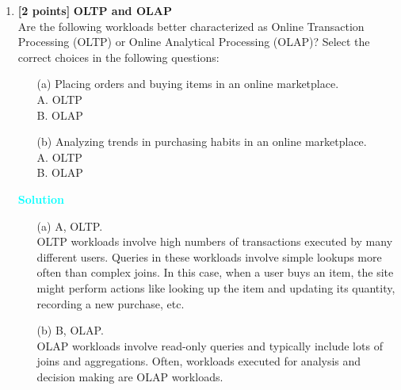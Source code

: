 \documentclass[10pt]{article}
\newenvironment{solution}
    { \begin{mdframed}[backgroundcolor=gray!10] \textcolor{cyan}{\textbf{Solution}} \\}
    {  \end{mdframed}}
\begin{document}
\begin{enumerate}
	\item \textbf{[2 points]} \textbf{OLTP and OLAP} \\
	      Are the following workloads better characterized as Online Transaction Processing (OLTP)
	      or Online Analytical Processing (OLAP)? Select the correct choices in the following questions: \\
	      \begin{itemize}
		      \item[(a)] Placing orders and buying items in an online marketplace. \\
		            A. OLTP \\
		            B. OLAP
		      \item[(b)] Analyzing trends in purchasing habits in an online marketplace. \\
		            A. OLTP \\
		            B. OLAP
	      \end{itemize}
	      \begin{solution}
		      \begin{itemize}
			      \item[(a)] A, OLTP. \\
			            OLTP workloads involve high numbers of transactions executed by many different users.
			            Queries in these workloads involve simple lookups more often than complex
			            joins. In this case, when a user buys an item, the site might perform actions like looking
			            up the item and updating its quantity, recording a new purchase, etc.
			      \item[(b)] B, OLAP.\\
			            OLAP workloads involve read-only queries and typically include lots of joins
			            and aggregations. Often, workloads executed for analysis and decision making are OLAP
			            workloads.
		      \end{itemize}
	      \end{solution}



\end{enumerate}
\end{document}
